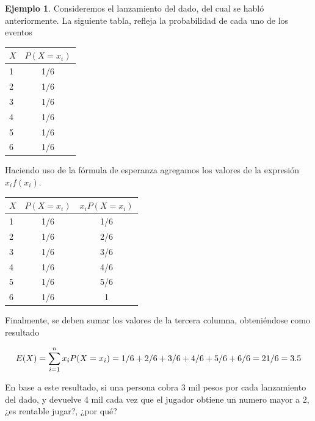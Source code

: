 \documentclass[
  11pt,
]{book}
\theoremstyle{definition}
\theoremstyle{definition}
\newtheorem{example}{Ejemplo}[chapter]
\theoremstyle{definition}
\theoremstyle{definition}
\theoremstyle{remark}
\begin{document}
\begin{example}
Consideremos el lanzamiento del dado, del cual se habló anteriormente. La siguiente tabla, refleja la probabilidad de cada uno de los eventos

\begin{table}[H]
\centering
\begin{tabular}[t]{lc}
\toprule
$X$ & $P(X = x_i)$\\
\midrule
1 & 1/6\\
2 & 1/6\\
3 & 1/6\\
4 & 1/6\\
5 & 1/6\\
6 & 1/6\\
\bottomrule
\end{tabular}
\end{table}

Haciendo uso de la fórmula de esperanza agregamos los valores de la expresión \(x_if(x_i)\).

\begin{table}[H]
\centering
\begin{tabular}[t]{lcc}
\toprule
$X$ & $P(X = x_i)$ & $x_iP(X=x_i)$\\
\midrule
1 & 1/6 & 1/6\\
2 & 1/6 & 2/6\\
3 & 1/6 & 3/6\\
4 & 1/6 & 4/6\\
5 & 1/6 & 5/6\\
6 & 1/6 & 1\\
\bottomrule
\end{tabular}
\end{table}

Finalmente, se deben sumar los valores de la tercera columna, obteniéndose como resultado

\begin{equation}
\notag
E(X) = \sum_{i=1}^n x_iP(X=x_i) = 1/6 + 2/6 +3/6 + 4/6 + 5/6 + 6/6 = 21/6 = 3.5
\end{equation}

En base a este resultado, si una persona cobra 3 mil pesos por cada lanzamiento del dado, y devuelve 4 mil cada vez que el jugador obtiene un numero mayor a 2, ¿es rentable jugar?, ¿por qué?
\end{example}
\end{document}
